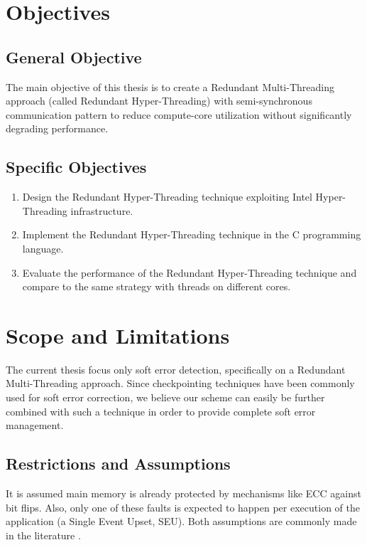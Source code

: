 \section{Objectives}
\label{sec:objectives}

\subsection{General Objective}
\label{subsec:generalObjective}
The main objective of this thesis is to create a Redundant Multi-Threading approach (called Redundant Hyper-Threading) with semi-synchronous communication pattern to reduce compute-core utilization without significantly degrading performance.

\subsection{Specific Objectives}
\label{subsec:specificObjective}

\begin{enumerate}
\item Design the Redundant Hyper-Threading technique exploiting Intel Hyper-Threading infrastructure.
\item Implement the Redundant Hyper-Threading technique in the C programming language. 
\item Evaluate the performance of the Redundant Hyper-Threading technique and compare to the same strategy with threads on different cores. 
\end{enumerate}

\section{Scope and Limitations}
\label{sec:scopeAndLimitations}
The current thesis focus only soft error detection, specifically on a Redundant Multi-Threading approach. Since checkpointing techniques have been commonly used for soft error correction, we believe our scheme can easily be further combined with such a technique in order to provide complete soft error management. 

\subsection{Restrictions and Assumptions}
\label{subsec:restrictionsAndAssumptions}
It is assumed main memory is already protected by mechanisms like ECC against bit flips. Also, only one of these faults is expected to happen per execution of the application (a Single Event Upset, SEU). Both assumptions are commonly made in the literature \cite{calhoun2017towards} \cite{kuvaiskii2016haft} \cite{mitropoulou2016comet} \cite{wang2007compiler} \cite{zhang2012daft}. 

